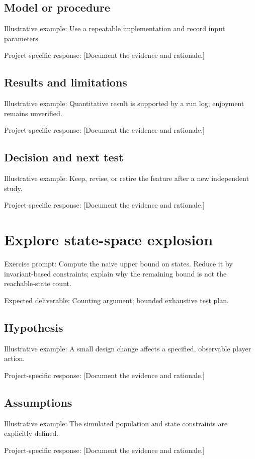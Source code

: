 \documentclass[11pt]{article}
\begin{document}
\subsection{Model or procedure}
Illustrative example: Use a repeatable implementation and record input parameters.

Project-specific response: [Document the evidence and rationale.]


\subsection{Results and limitations}
Illustrative example: Quantitative result is supported by a run log; enjoyment remains unverified.

Project-specific response: [Document the evidence and rationale.]


\subsection{Decision and next test}
Illustrative example: Keep, revise, or retire the feature after a new independent study.

Project-specific response: [Document the evidence and rationale.]


\section{Explore state-space explosion}
Exercise prompt: Compute the naive upper bound on states. Reduce it by invariant-based constraints; explain why the remaining bound is not the reachable-state count.

Expected deliverable: Counting argument; bounded exhaustive test plan.


\subsection{Hypothesis}
Illustrative example: A small design change affects a specified, observable player action.

Project-specific response: [Document the evidence and rationale.]


\subsection{Assumptions}
Illustrative example: The simulated population and state constraints are explicitly defined.

Project-specific response: [Document the evidence and rationale.]
\end{document}
